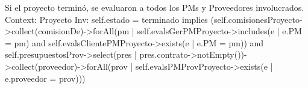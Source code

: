 \begin{listocl}
\begin{itemocl}{Si el proyecto terminó, se evaluaron a todos los PMs y Proveedores involucrados.}
Context: Proyecto
Inv: self.estado = terminado implies (self.comisionesProyecto->collect(comisionDe)->forAll(pm | self.evalsGerPMProyecto->includes(e | e.PM = pm) and self.evalsClientePMProyecto->exists(e | e.PM = pm)) and self.presupuestosProv->select(pres | pres.contrato->notEmpty())->collect(proveedor)->forAll(prov | self.evalsPMProvProyecto->exists(e | e.proveedor = prov)))
\end{itemocl}


\end{listocl}
